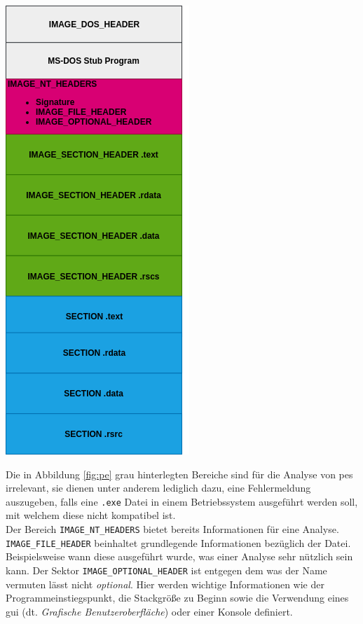 \documentclass[
    12pt, %
    DIV10,
    ngerman, %
    a4paper, %
    oneside, %
    titlepage, %
    parskip=half, %
    headings=normal, %
    listof=totoc, %
    bibliography=totoc, %
    index=totoc, %
    captions=tableheading, %
    final %
]{scrreprt}
\begin{document}
\begin{center}
\includegraphics[scale=0.5]{img/pe.png}
\label{fig:pe}
\end{center}
Die in Abbildung \ref{fig:pe} grau hinterlegten Bereiche sind für die Analyse von \ac{pes} irrelevant, sie dienen unter anderem lediglich dazu, eine Fehlermeldung auszugeben, falls eine \texttt{.exe} Datei in einem Betriebssystem ausgeführt werden soll, mit welchem diese nicht kompatibel ist.\\
Der Bereich \texttt{IMAGE\_NT\_HEADERS} bietet bereits Informationen für eine Analyse. \texttt{IMAGE\_FILE\_HEADER} beinhaltet grundlegende Informationen bezüglich der Datei. Beispielsweise wann diese ausgeführt wurde, was einer Analyse sehr nützlich sein kann. Der Sektor \texttt{IMAGE\_OPTIONAL\_HEADER} ist entgegen dem was der Name vermuten lässt nicht \emph{optional}. Hier werden wichtige Informationen wie der Programmeinstiegspunkt, die Stackgröße zu Beginn sowie die Verwendung eines \ac{gui} (dt. \emph{Grafische Benutzeroberfläche}) oder einer Konsole definiert.\\
\end{document}
